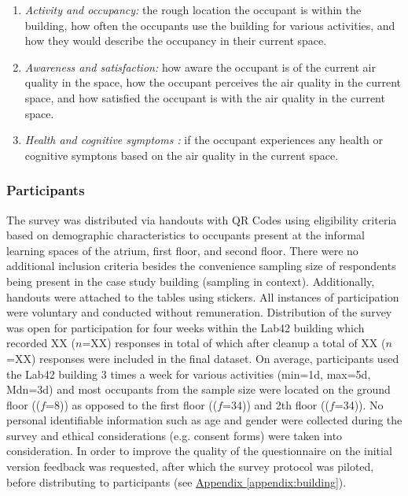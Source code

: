 \begin{enumerate}
  \item \textit{Activity and occupancy:} the rough location the occupant is within the building, how often the occupants use the building for various activities, and how they would describe the occupancy in their current space.
  \item \textit{Awareness and satisfaction:} how aware the occupant is of the current air quality in the space, how the occupant perceives the air quality in the current space, and how satisfied the occupant is with the air quality in the current space.
  \item \textit{Health and cognitive symptoms :} if the occupant experiences any health or cognitive symptons based on the air quality in the current space.
\end{enumerate}


\subsubsection{Participants}
The survey was distributed via handouts with QR Codes using eligibility criteria based on demographic characteristics to occupants present at the informal learning spaces of the atrium, first floor, and second floor. There were no additional inclusion criteria besides the convenience sampling size of respondents being present in the case study building (sampling in context). Additionally, handouts were attached to the tables using stickers. All instances of participation were voluntary and conducted without remuneration. Distribution of the survey was open for participation for four weeks within the Lab42 building which recorded XX ($n$=XX) responses in total of which after cleanup a total of XX ($n$=XX) responses were included in the final dataset. On average, participants used the Lab42 building 3 times a week for various activities (min=1d, max=5d, Mdn=3d) and most occupants from the sample size were located on the ground floor (($f$=8)) as opposed to the first floor (($f$=34)) and 2th floor (($f$=34)). No personal identifiable information such as age and gender were collected during the survey and ethical considerations (e.g. consent forms) were taken into consideration. In order to improve the quality of the questionnaire on the initial version feedback was requested, after which the survey protocol was piloted, before distributing to participants (see \hyperref[appendix:building]{Appendix \ref*{appendix:building}}).

